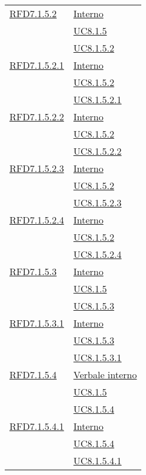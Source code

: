 \begin{longtable}{|>{\centering}m{5cm}|m{5cm}<{\centering}|}
\hyperlink{RFD7.1.5.2}{RFD7.1.5.2} & \hyperlink{Interno}{Interno}\\
& \hyperref[UC8.1.5]{UC8.1.5}\\
& \hyperref[UC8.1.5.2]{UC8.1.5.2}\\ \hline

\hyperlink{RFD7.1.5.2.1}{RFD7.1.5.2.1} & \hyperlink{Interno}{Interno}\\
& \hyperref[UC8.1.5.2]{UC8.1.5.2}\\
& \hyperref[UC8.1.5.2.1]{UC8.1.5.2.1}\\ \hline

\hyperlink{RFD7.1.5.2.2}{RFD7.1.5.2.2} & \hyperlink{Interno}{Interno}\\
& \hyperref[UC8.1.5.2]{UC8.1.5.2}\\
& \hyperref[UC8.1.5.2.2]{UC8.1.5.2.2}\\ \hline

\hyperlink{RFD7.1.5.2.3}{RFD7.1.5.2.3} & \hyperlink{Interno}{Interno}\\
& \hyperref[UC8.1.5.2]{UC8.1.5.2}\\
& \hyperref[UC8.1.5.2.3]{UC8.1.5.2.3}\\ \hline

\hyperlink{RFD7.1.5.2.4}{RFD7.1.5.2.4} & \hyperlink{Interno}{Interno}\\
& \hyperref[UC8.1.5.2]{UC8.1.5.2}\\
& \hyperref[UC8.1.5.2.4]{UC8.1.5.2.4}\\ \hline

\hyperlink{RFD7.1.5.3}{RFD7.1.5.3} & \hyperlink{Interno}{Interno}\\
& \hyperref[UC8.1.5]{UC8.1.5}\\
& \hyperref[UC8.1.5.3]{UC8.1.5.3}\\ \hline

\hyperlink{RFD7.1.5.3.1}{RFD7.1.5.3.1} & \hyperlink{Interno}{Interno}\\
& \hyperref[UC8.1.5.3]{UC8.1.5.3}\\
& \hyperref[UC8.1.5.3.1]{UC8.1.5.3.1}\\ \hline

\hyperlink{RFD7.1.5.4}{RFD7.1.5.4} & \hyperlink{Verbale interno}{Verbale interno}\\
& \hyperref[UC8.1.5]{UC8.1.5}\\
& \hyperref[UC8.1.5.4]{UC8.1.5.4}\\ \hline

\hyperlink{RFD7.1.5.4.1}{RFD7.1.5.4.1} & \hyperlink{Interno}{Interno}\\
& \hyperref[UC8.1.5.4]{UC8.1.5.4}\\
& \hyperref[UC8.1.5.4.1]{UC8.1.5.4.1}\\ \hline


\end{longtable}
